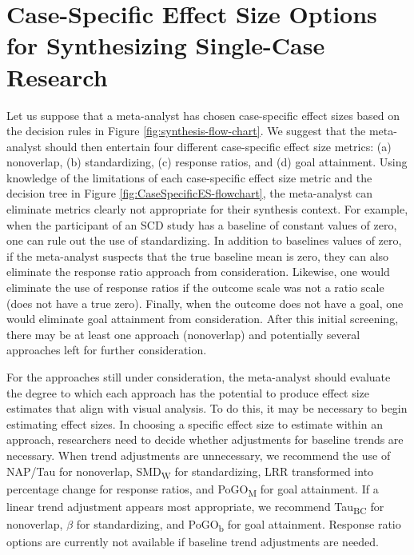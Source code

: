 \documentclass[
]{book}
\begin{document}
\hypertarget{case-specific-effect-size-options-for-synthesizing-single-case-research}{%
\section{Case-Specific Effect Size Options for Synthesizing Single-Case Research}\label{case-specific-effect-size-options-for-synthesizing-single-case-research}}

Let us suppose that a meta-analyst has chosen case-specific effect sizes based on the decision rules in Figure \ref{fig:synthesis-flow-chart}. We suggest that the meta-analyst should then entertain four different case-specific effect size metrics: (a) nonoverlap, (b) standardizing, (c) response ratios, and (d) goal attainment. Using knowledge of the limitations of each case-specific effect size metric and the decision tree in Figure \ref{fig:CaseSpecificES-flowchart}, the meta-analyst can eliminate metrics clearly not appropriate for their synthesis context. For example, when the participant of an SCD study has a baseline of constant values of zero, one can rule out the use of standardizing. In addition to baselines values of zero, if the meta-analyst suspects that the true baseline mean is zero, they can also eliminate the response ratio approach from consideration. Likewise, one would eliminate the use of response ratios if the outcome scale was not a ratio scale (does not have a true zero). Finally, when the outcome does not have a goal, one would eliminate goal attainment from consideration. After this initial screening, there may be at least one approach (nonoverlap) and potentially several approaches left for further consideration.

For the approaches still under consideration, the meta-analyst should evaluate the degree to which each approach has the potential to produce effect size estimates that align with visual analysis. To do this, it may be necessary to begin estimating effect sizes. In choosing a specific effect size to estimate within an approach, researchers need to decide whether adjustments for baseline trends are necessary. When trend adjustments are unnecessary, we recommend the use of NAP/Tau for nonoverlap, SMD\textsubscript{W} for standardizing, LRR transformed into percentage change for response ratios, and PoGO\textsubscript{M} for goal attainment. If a linear trend adjustment appears most appropriate, we recommend Tau\textsubscript{BC} for nonoverlap, \(\beta\) for standardizing, and PoGO\textsubscript{b} for goal attainment. Response ratio options are currently not available if baseline trend adjustments are needed.
\end{document}
